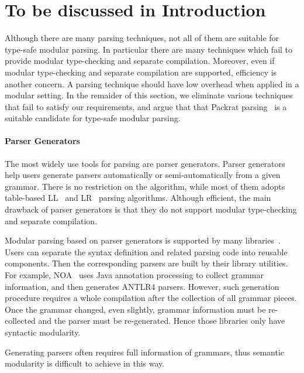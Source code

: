 \section{To be discussed in Introduction}


Although there are many parsing techniques, not all of them are
suitable for type-safe modular parsing. In particular there are many
techniques which fail to provide modular type-checking and separate
compilation. Moreover, even if modular type-checking and separate
compilation are supported, efficiency is another
concern. A parsing technique should have low overhead when applied
in a modular setting. In the remaider of this section, we eliminate
various techniques that fail to satisfy our requirements, and argue
that that Packrat parsing~\cite{Ford2002} is a suitable candidate for
type-safe modular parsing.

\paragraph{Parser Generators} The most widely use tools for parsing
are parser generators. Parser generators help users generate parsers automatically or
semi-automatically from a given grammar. There is no restriction on
the algorithm, while most of them adopts table-based LL~\cite{lewis1968syntax} and LR~\cite{knuth1965translation} parsing
algorithms.
Although efficient, the main drawback of parser generators is that they do not support
modular type-checking and separate compilation.

Modular parsing based on parser generators is supported by many libraries~\cite{antlr1995,Grimm2006,Gouseti2014,Warth2016}. Users can separate the syntax definition and related parsing code into reusable components. Then the corresponding parsers are built by their library utilities. For example, NOA~\cite{Gouseti2014} uses Java annotation processing to collect grammar information, and then generates ANTLR4 parsers. However, such generation procedure requires a whole compilation after the collection of all grammar pieces. Once the grammar changed, even slightly, grammar information must be re-collected and the parser must be re-generated. Hence those libraries only have syntactic modularity.

Generating parsers often requires full information of grammars, thus semantic modularity is difficult to achieve in this way.

